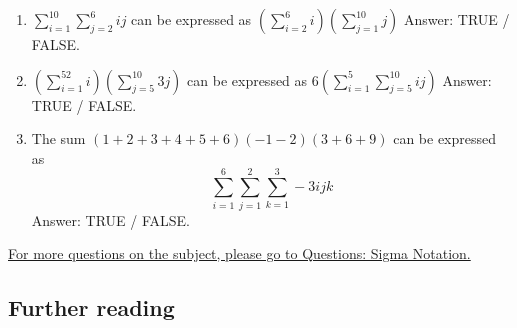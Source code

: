 \documentclass[
  12pt,
  a4paper, oneside]{starmastarticle}
\begin{document}
\begin{enumerate}
\def\labelenumi{(\alph{enumi})}
\item
  \(\sum_{i=1}^{10}\sum_{j=2}^6 ij\) can be expressed as
  \((\sum_{i=2}^6i)(\sum_{j=1}^{10} j)\) Answer: TRUE / FALSE.
\item
  \((\sum_{i=1}^52i)(\sum_{j=5}^{10} 3j)\) can be expressed as
  \(6(\sum_{i=1}^5\sum_{j=5}^{10} ij)\) Answer: TRUE / FALSE.
\item
  The sum \((1+2+3+4+5+6)(-1-2)(3+6+9)\) can be expressed as
  \[\sum_{i=1}^6\sum_{j=1}^2\sum_{k=1}^3 -3ijk\] Answer: TRUE / FALSE.
\end{enumerate}

\href{qs-sigma-notation.qmd}{For more questions on the subject, please
go to Questions: Sigma Notation.}

\hypertarget{further-reading}{%
\subsection{Further reading}\label{further-reading}}
\end{document}
